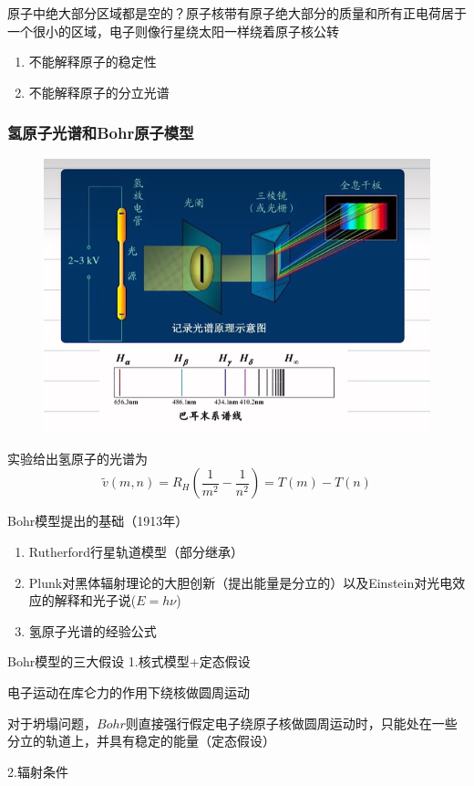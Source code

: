 \documentclass[lang=cn,10pt]{elegantbook}
\begin{document}
原子中绝大部分区域都是空的？原子核带有原子绝大部分的质量和所有正电荷居于一个很小的区域，电子则像行星绕太阳一样绕着原子核公转

\begin{enumerate}
	\item 不能解释原子的稳定性
	\item 不能解释原子的分立光谱
\end{enumerate}
\subsubsection{氢原子光谱和Bohr原子模型}

\begin{figure}[H]
	\centering
	\includegraphics[width=0.7\linewidth]{figure/screenshot0014}
\end{figure}

实验给出氢原子的光谱为
\begin{equation}
	\tilde{v}\left( m,n \right) =R_H\left( \frac{1}{m^2}-\frac{1}{n^2} \right) =T\left( m \right) -T\left( n \right) 
\end{equation}

Bohr模型提出的基础（1913年）
\begin{enumerate}
	\item Rutherford行星轨道模型（部分继承）
	\item Plunk对黑体辐射理论的大胆创新（提出能量是分立的）以及Einstein对光电效应的解释和光子说($E=h$$\nu$)
	\item 氢原子光谱的经验公式
\end{enumerate}
Bohr模型的三大假设
1.核式模型+定态假设

电子运动在库仑力的作用下绕核做圆周运动

对于坍塌问题，$Bohr$则直接强行假定电子绕原子核做圆周运动时，只能处在一些分立的轨道上，并具有稳定的能量（定态假设）

2.辐射条件
\end{document}
